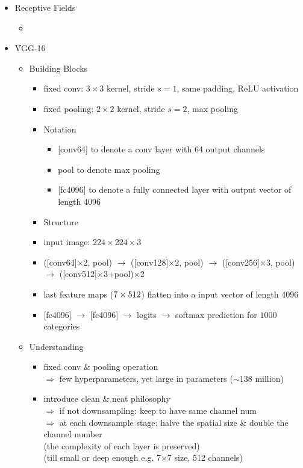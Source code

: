 \begin{itemize}
\item Receptive Fields
	\begin{itemize}
	\item 
	\end{itemize}

\item VGG-16
	\begin{itemize}
	\item Building Blocks
		\begin{itemize}
		\item fixed conv: $3\times3$ kernel, stride $s=1$, same padding, ReLU activation
		\item fixed pooling: $2\times2$ kernel, stride $s=2$, max pooling
	\item Notation
		\begin{itemize}
		\item{} [conv64] to denote a conv layer with 64 output channels
		\item pool to denote max pooling
		\item{} [fc4096] to denote a fully connected layer with output vector of length 4096
		\end{itemize}
	\item Structure
		\item input image: $224\times224\times3$
		\item{} ([conv64]$\times$2, pool) $\rightarrow$ ([conv128]$\times$2, pool) $\rightarrow$ ([conv256]$\times$3, pool) $\rightarrow$ ([conv512]$\times$3+pool)$\times$2
		\item last feature maps ($7\time7\times512$) flatten into a input vector of length 4096
		\item{} [fc4096] $\rightarrow$ [fc4096] $\rightarrow$ logits $\rightarrow$ softmax prediction for $1000$ categories
		\end{itemize}
	\item Understanding
		\begin{itemize}
		\item fixed conv \& pooling operation \\
		$\Rightarrow$ few hyperparameters, yet large in parameters ($\sim$138 million)
		\item introduce clean \& neat philosophy \\
		$\Rightarrow$ if not downsampling: keep to have same channel num \\
		$\Rightarrow$ at each downsample stage: halve the spatial size \& double the channel number \\
		(the complexity of each layer is preserved) \\
		(till small or deep enough e.g. 7$\times$7 size, 512 channels)
		\end{itemize}
	\end{itemize}


\end{itemize}
